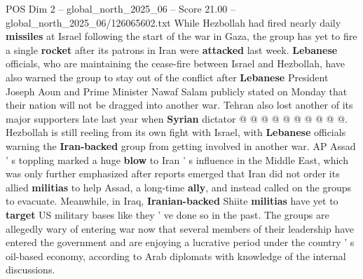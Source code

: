\begin{textsample}{POS Dim 2 – global\_north\_2025\_06 – Score 21.00 – global\_north\_2025\_06/126065602.txt}
While Hezbollah had fired nearly daily \textbf{missiles} at Israel following the start of the war in Gaza, the group has yet to fire a single \textbf{rocket} after its patrons in Iran were \textbf{attacked} last week. \textbf{Lebanese} officials, who are maintaining the cease-fire between Israel and Hezbollah, have also warned the group to stay out of the conflict after \textbf{Lebanese} President Joseph Aoun and Prime Minister Nawaf Salam publicly stated on Monday that their nation will not be dragged into another war.
Tehran also lost another of its major supporters late last year when \textbf{Syrian} dictator @ @ @ @ @ @ @ @ @ @.
Hezbollah is still reeling from its own fight with Israel, with \textbf{Lebanese} officials warning the \textbf{Iran-backed} group from getting involved in another war.
AP Assad ' s toppling marked a huge \textbf{blow} to Iran ' s influence in the Middle East, which was only further emphasized after reports emerged that Iran did not order its allied \textbf{militias} to help Assad, a long-time \textbf{ally}, and instead called on the groups to evacuate.
Meanwhile, in Iraq, \textbf{Iranian-backed} Shiite \textbf{militias} have yet to \textbf{target} US military bases like they ' ve done so in the past.
The groups are allegedly wary of entering war now that several members of their leadership have entered the government and are enjoying a lucrative period under the country ' s oil-based economy, according to Arab diplomats with knowledge of the internal discussions.

\end{textsample}
